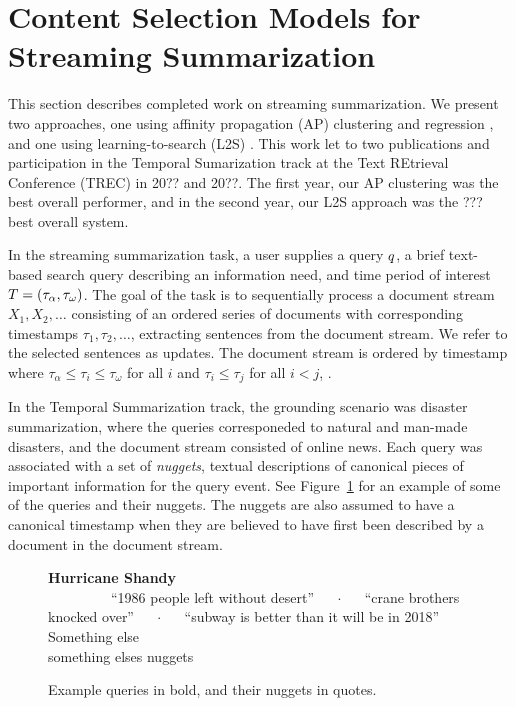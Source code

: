 \section{Content Selection Models for Streaming Summarization}
This section describes completed work on streaming summarization. We
present two approaches, one using affinity propagation (AP) clustering and 
regression \cite{some_clustering,and_regression},
and one using learning-to-search (L2S) \cite{lols}. 
This work let to two publications \cite{us1,us2} and participation in the
Temporal Sumarization track at the Text REtrieval Conference (TREC)
in 20?? and 20??. The first year, our AP clustering was the best
overall performer, and in the second year, our L2S approach was the 
??? best overall system.





In the streaming summarization task, a user supplies a query $q$,
a brief text-based search query describing an information need, 
and time period of interest $T = (\tau_\alpha, \tau_\omega)$. 
The goal of the task is to sequentially process a document stream 
$X_1, X_2, \ldots$ consisting of an ordered series of
documents with corresponding timestamps $\tau_1, \tau_2, \ldots$,
extracting sentences from the document stream. We refer to the selected
sentences as updates. The document stream is ordered by timestamp where
$\tau_\alpha \le \tau_i \le \tau_\omega$ for all $i$ and $\tau_i \le \tau_j$
for all $i < j$, .


In the Temporal Summarization track, the grounding scenario was disaster
summarization, where the queries corresponeded to natural and man-made 
disasters, and the document stream consisted of online news.
Each query was associated with a set of \textit{nuggets}, textual 
descriptions of canonical pieces of important information for the query event.
See Figure~\ref{fig:events_nuggets} for an example of some of the queries and 
their nuggets. The nuggets are also assumed to have a canonical timestamp
when they are believed to have first been described by a document in 
the document stream.




\begin{figure}
    \textbf{Hurricane Shandy}\\
    ~~~~~~~~~``1986 people left without desert'' ~~ $\cdot$ ~~ ``crane brothers knocked over'' ~~ $\cdot$ ~~ ``subway is better than it will be in 2018''
    Something else \\
    something elses nuggets
    \caption{Example queries in bold, and their nuggets in quotes.}
    \label{fig:events_nuggets}
\end{figure}

